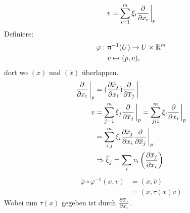\begin{align}
v = \sum_{i=1}^{m} \xi_i \pdv{x_i}\eval_p
\end{align}
Definiere:
\begin{align*}
\varphi: \ &\uppi^{-1} (U) \to U \times \mathbb{R}^m\\
& v \mapsto (p, v),
\end{align*}
dort wo $(x)$ und $(\overline{x})$ überlappen.
\begin{align*}
\pdv{x_i} \eval_p &= (\pdv{\overline{x}_j}{x_i})\pdv{\overline{x}_j} \eval\\
v &= \sum_{j=1}^{m} \xi_j \pdv{\overline{x}_j}  \eval_p = \sum_{ji1}^{m} \xi_i \pdv{x_i}  \eval_p \\
&= \sum_{i, j}^{m} \xi_i \pdv{\overline{x}_j}{x_i}  \pdv{\overline{x}_j}\eval_p\\
&\Rightarrow \overline{\xi}_j = \sum_i v_i \left( \pdv{\overline{x}_j}{x_i} \right)
\end{align*}
\begin{align}
\overline{\varphi} \circ \varphi^{-1}(x, v) &= (x, \overline{v})\\
 &= (x, \tau(x) v)
\end{align}
Wobei nun $\tau(x)$ gegeben ist durch $\pdv{\overline{x}_j}{x_i}$.\\
